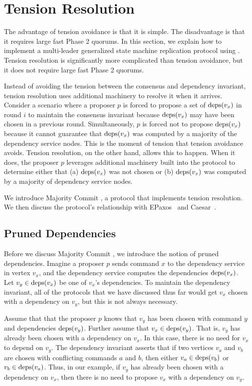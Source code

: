 \section{Tension Resolution}
The advantage of tension avoidance is that it is simple. The disadvantage is
that it requires large fast Phase 2 quorums. In this section, we explain how to
implement a multi-leader generalized state machine replication protocol using
. Tension resolution is significantly more
complicated than tension avoidance, but it does not require large fast Phase 2
quorums.

Instead of avoiding the tension between the consensus and dependency invariant,
tension resolution uses additional machinery to resolve it when it arrives.
Consider a scenario where a proposer $p$ is forced to propose a set of
$\text{deps}(v_x)$ in round $i$ to maintain the consensus invariant because
$\text{deps}(v_x)$ may have been chosen in a previous round. Simultaneously, $p$ is
forced not to propose $\text{deps}(v_x)$ because it cannot guarantee that
$\text{deps}(v_x)$ was computed by a majority of the dependency service nodes. This
is the moment of tension that tension avoidance avoids. Tension resolution, on
the other hand, allows this to happen. When it does, the proposer $p$ leverages
additional machinery built into the protocol to determine either that (a)
$\text{deps}(v_x)$ was not chosen or (b) $\text{deps}(v_x)$ was computed by a majority of
dependency service nodes.

We introduce Majority Commit \BPaxos{}, a protocol that implements tension
resolution. We then discuss the protocol's relationship with
EPaxos~\cite{moraru2013there} and Caesar~\cite{enes2020state}.

\subsection{Pruned Dependencies}
Before we discuss Majority Commit \BPaxos{}, we introduce the notion of pruned
dependencies. Imagine a proposer $p$ sends command $x$ to the dependency
service in vertex $v_x$, and the dependency service computes the dependencies
$\text{deps}(v_x)$. Let $v_y \in \text{deps}(v_x)$ be one of $v_x$'s dependencies. To
maintain the dependency invariant, all of the protocols that we have discussed
thus far would get $v_x$ chosen with a dependency on $v_y$, but this is not
always necessary.

Assume that that the proposer $p$ knows that $v_y$ has been chosen with command
$y$ and dependencies $\text{deps}(v_y)$. Further assume that $v_x \in \text{deps}(v_y)$.
That is, $v_y$ has already been chosen with a dependency on $v_x$. In this
case, there is no need for $v_x$ to depend on $v_y$. The dependency invariant
asserts that if two vertices $v_a$ and $v_b$ are chosen with conflicting
commands $a$ and $b$, then either $v_a \in \text{deps}(v_b)$ or $v_b \in \text{deps}(v_a)$.
Thus, in our example, if $v_y$ has already been chosen with a dependency on
$v_x$, then there is no need to propose $v_x$ with a dependency on $v_y$.

